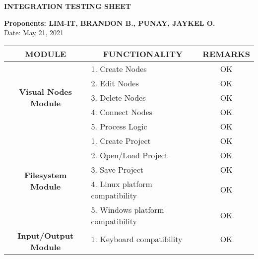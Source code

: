 \clearpage
{}
\textbf{INTEGRATION TESTING SHEET}
\leavevmode\\
\begin{flushleft}
	\textbf{Proponents: LIM-IT, BRANDON B., PUNAY, JAYKEL O.}
	\leavevmode\\
	Date: May 21, 2021
\end{flushleft}

\begin{longtable}[c]{|c|l|c|}
\hline
\textbf{MODULE}                               & \multicolumn{1}{c|}{\textbf{FUNCTIONALITY}} & \textbf{REMARKS} \\ \hline
\endfirsthead
%
\endhead
%
\multirow{5}{*}{\textbf{Visual Nodes Module}} & 1. Create Nodes                             & OK               \\ \cline{2-3} 
                                              & 2. Edit Nodes                               & OK               \\ \cline{2-3} 
                                              & 3. Delete Nodes                             & OK               \\ \cline{2-3} 
                                              & 4. Connect Nodes                            & OK               \\ \cline{2-3} 
                                              & 5. Process Logic                            & OK               \\ \hline
\multirow{5}{*}{\textbf{Filesystem Module}}   & 1. Create Project                           & OK               \\ \cline{2-3} 
                                              & 2. Open/Load Project                        & OK               \\ \cline{2-3} 
                                              & 3. Save Project                             & OK               \\ \cline{2-3} 
                                              & 4. Linux platform compatibility             & OK               \\ \cline{2-3} 
                                              & 5. Windows platform compatibility           & OK               \\ \hline
\multirow{4}{*}{\textbf{Input/Output Module}} & 1. Keyboard compatibility                   & OK               \\ \cline{2-3} 

\end{longtable}
